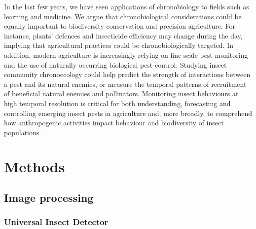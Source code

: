 \documentclass[12pt]{article}
\begin{document}
\begin{linenumbers}
		
		In the last few years, we have seen applications of chronobiology to fields such as learning\cite{smarr_time_2014} and medicine\cite{cederroth_medicine_2019}. We argue that chronobiological considerations could be equally important to biodiversity conservation and precision agriculture\cite{gottlieb_agro-chronobiology_2019,karapetyan_redox_2018,khyati_insect_2017}. For instance, plants’ defences\cite{goodspeed_arabidopsis_2012,jander_timely_2012} and insecticide efficiency\cite{balmert_time--day_2014,khalid_circadian_2019} may change during the day, implying that agricultural practices could be chronobiologically targeted. In addition, modern agriculture is increasingly relying on fine-scale pest monitoring and the use of naturally occurring biological pest control\cite{gagic_better_2021,tooker_balancing_2020}. Studying insect community chronoecology could help predict the strength of interactions between a pest and its natural enemies, or measure the temporal patterns of recruitment of beneficial natural enemies and pollinators. Monitoring insect behaviours at high temporal resolution is critical for both understanding, forecasting and controlling emerging insect pests in agriculture and, more broadly, to comprehend how anthropogenic activities impact behaviour and biodiversity of insect populations.

		\section*{Methods}

		
		\subsection*{Image processing}

		\subsubsection*{Universal Insect Detector}

\end{linenumbers}
\end{document}
